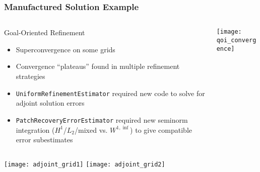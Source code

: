 \begin{frame}
\frametitle{Manufactured Solution Example}
\begin{columns}
\begin{column}{.7\textwidth}
\begin{block}{Goal-Oriented Refinement}
\begin{itemize}
\item Superconvergence on some grids
\item Convergence ``plateaus'' found in multiple refinement strategies
\item \texttt{UniformRefinementEstimator} required new code to
solve for adjoint solution errors
\item \texttt{PatchRecoveryErrorEstimator} required new seminorm
integration ($H^1$/$L_2$/mixed vs. $W^{1,\inf}$) to give compatible error subestimates
\end{itemize}
\end{block}
\end{column}
\begin{column}{.3\textwidth}
\begin{center}
\texttt{[image: qoi\_convergence]}
\end{center}
\end{column}
\end{columns}

\begin{center}
\texttt{[image: adjoint\_grid1]}
\;\;\;\;
\texttt{[image: adjoint\_grid2]}
\end{center}


\end{frame}

